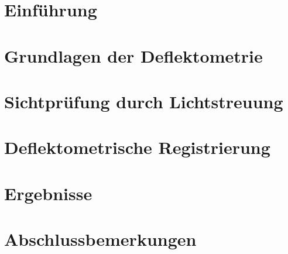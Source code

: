 \documentclass[ngerman,11pt,a4paper]{report}
\begin{document}
	{
		\FloatBarrier %
		\chapter{Einführung}
		\label{chp:einfuehrung}
		
	}
	
	{
		\FloatBarrier %
		\chapter{Grundlagen der Deflektometrie}
		\label{chp:grundlagenDeflektometrie}
		
	}
	
	{
		\FloatBarrier %
		\chapter{Sichtprüfung durch Lichtstreuung}
		\label{chp:sichtpruefungDurchLichtstreuung}
		
	}
	
	{
		\FloatBarrier %
		\chapter{Deflektometrische Registrierung}
		\label{chp:deflektometrischeRegistrierung}
		
	}
	
	{
		\FloatBarrier %
		\chapter{Ergebnisse}
		\label{chp:ergebnisse}
		
	}
	
	{
		\FloatBarrier %
		\chapter{Abschlussbemerkungen}
		\label{chp:abschlussbemerkungen}
		
	}
	
	{
		\FloatBarrier %
		\newpage
		\printbibliography[title = Quellenverzeichnis]
	}
\end{document}
